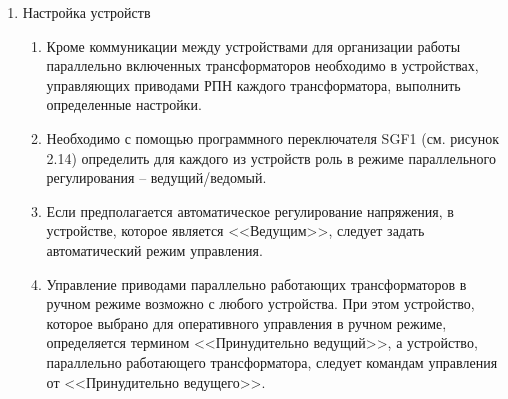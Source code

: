 \begin{enumerate}[label=\arabic{section}.\arabic{subsection}.\arabic{enumi}, labelsep=4pt, leftmargin=0pt, itemindent=57pt, itemsep=0pt, parsep=5pt]
\begin{enumerate}[label=\arabic{section}.\arabic{subsection}.\arabic{enumi}, labelsep=4pt, leftmargin=0pt, itemindent=57pt, itemsep=0pt, parsep=5pt]
            \begin{itemize}
                \item сигнал готовности к режиму регулирования параллельно работающего трансформатора;
                \item	устройство регулирования параллельно работающего трансформатора в режиме автоматического регулирования;
                \item ненормальный режим на секции параллельно работающего трансформатора;
                \item параллельно работающий трансформатор не имеет связи с шинами;
                \item устройство регулирования параллельно работающего трансформатора в режиме <<Ведущий>>;
                \item устройство регулирования параллельно работающего трансформатора в режиме <<Принудительно ведущий>>;
                \item текущее положение РПН параллельно работающего трансформатора.
            \end{itemize} 
    \end{enumerate}

\item Настройка устройств
    \begin{enumerate}[label=\arabic{section}.\arabic{subsection}.\arabic{enumi}, labelsep=4pt, leftmargin=0pt, itemindent=57pt, itemsep=0pt, parsep=5pt]
        \item 
        Кроме коммуникации между устройствами для организации работы параллельно включенных трансформаторов необходимо в устройствах, управляющих приводами РПН каждого трансформатора, выполнить определенные настройки.
        \item 
        Необходимо с помощью программного переключателя SGF1 (см. рисунок 2.14) определить для каждого из устройств роль в  режиме параллельного регулирования – ведущий/ведомый.
        \item
        Если предполагается автоматическое регулирование напряжения, в устройстве, которое является <<Ведущим>>, следует задать автоматический режим управления.
        \item
        Управление приводами параллельно работающих трансформаторов в ручном режиме возможно с любого устройства. При этом устройство, которое выбрано для оперативного управления в ручном режиме, определяется термином <<Принудительно ведущий>>, а устройство, параллельно работающего трансформатора, следует командам управления от <<Принудительно ведущего>>.  
    \end{enumerate}


\end{enumerate}
